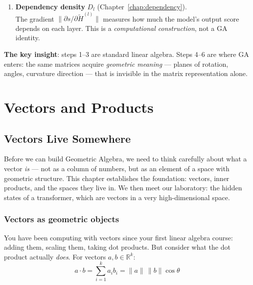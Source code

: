 \documentclass[11pt, twoside, openright]{memoir}
\newcommand{\ip}{\cdot}           %
\numberwithin{equation}{chapter}
\begin{document}
\begin{enumerate}
\item \textbf{Dependency density} $D_l$
  (Chapter~\ref{chap:dependency}).  \\
  The gradient $\|\partial s / \partial \widetilde{H}^{(l)}\|$
  measures how much the model's output score depends on each layer.
  This is a \emph{computational construction}, not a GA identity.
\end{enumerate}

\vspace{0.5em}
\noindent
\textbf{The key insight}: steps 1--3 are standard linear algebra.
Steps 4--6 are where GA enters: the same matrices acquire
\emph{geometric meaning} --- planes of rotation, angles, curvature
direction --- that is invisible in the matrix representation alone.

\clearpage

\part{Vectors and Products}
\label{part:foundations}


\chapter{Vectors Live Somewhere}
\label{chap:vectors}

\begin{whycare}
Before we can build Geometric Algebra, we need to think carefully about
what a vector \emph{is} --- not as a column of numbers, but as an element
of a space with geometric structure.  This chapter establishes the
foundation: vectors, inner products, and the spaces they live in.  We
then meet our laboratory: the hidden states of a transformer, which are
vectors in a very high-dimensional space.
\end{whycare}

\section{Vectors as geometric objects}

You have been computing with vectors since your first linear algebra
course: adding them, scaling them, taking dot products.  But consider
what the dot product actually \emph{does}.  For vectors
$a, b \in \mathbb{R}^k$:
\begin{equation}
  a \ip b = \sum_{i=1}^{k} a_i b_i = \|a\| \, \|b\| \cos\theta
\end{equation}
\end{document}
